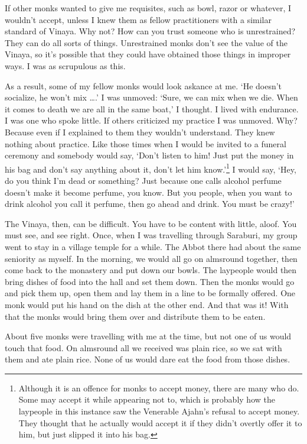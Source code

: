 If other monks wanted to give me requisites, such as bowl, razor or whatever, I wouldn't accept, unless I knew them as fellow practitioners with a similar standard of Vinaya. Why not? How can you trust someone who is unrestrained? They can do all sorts of things. Unrestrained monks don't see the value of the Vinaya, so it's possible that they could have obtained those things in improper ways. I was as scrupulous as this.

As a result, some of my fellow monks would look askance at me. `He doesn't socialize, he won't mix \ldots{}.' I was unmoved: `Sure, we can mix when we die. When it comes to death we are all in the same boat,' I thought. I lived with endurance. I was one who spoke little. If others criticized my practice I was unmoved. Why? Because even if I explained to them they wouldn't understand. They knew nothing about practice. Like those times when I would be invited to a funeral ceremony and somebody would say, `Don't listen to him! Just put the money in his bag and don't say anything about it, don't let him know.'\footnote{Although it is an offence for monks to accept money, there are many who do. Some may accept it while appearing not to, which is probably how the laypeople in this instance saw the Venerable Ajahn's refusal to accept money. They thought that he actually would accept it if they didn't overtly offer it to him, but just slipped it into his bag.} I would say, `Hey, do you think I'm dead or something? Just because one calls alcohol perfume doesn't make it become perfume, you know. But you people, when you want to drink alcohol you call it perfume, then go ahead and drink. You must be crazy!'

The Vinaya, then, can be difficult. You have to be content with little, aloof. You must see, and see right. Once, when I was travelling through Saraburi, my group went to stay in a village temple for a while. The Abbot there had about the same seniority as myself. In the morning, we would all go on almsround together, then come back to the monastery and put down our bowls. The laypeople would then bring dishes of food into the hall and set them down. Then the monks would go and pick them up, open them and lay them in a line to be formally offered. One monk would put his hand on the dish at the other end. And that was it! With that the monks would bring them over and distribute them to be eaten.

About five monks were travelling with me at the time, but not one of us would touch that food. On almsround all we received was plain rice, so we sat with them and ate plain rice. None of us would dare eat the food from those dishes.

